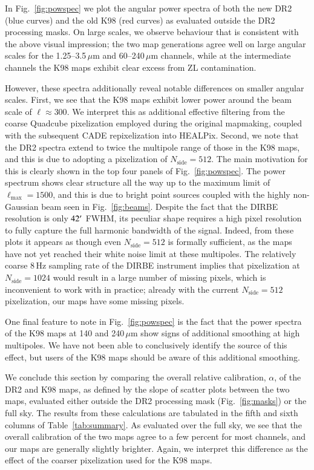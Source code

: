 \documentclass{aa}
\begin{document}
In Fig.~\ref{fig:powspec} we plot the angular power spectra of both
the new DR2 (blue curves) and the old K98 (red curves) as evaluated
outside the DR2 processing masks. On large scales, we observe
behaviour that is consistent with the above visual impression; the two
map generations agree well on large angular scales for the
1.25--3.5$\,\mu$m and 60--240$\,\mu$m channels, while at the
intermediate channels the K98 maps exhibit clear excess from ZL
contamination.

However, these spectra additionally reveal notable differences on
smaller angular scales. First, we see that the K98 maps exhibit lower
power around the beam scale of $\ell\approx300$. We interpret this as
additional effective filtering from the coarse Quadcube
pixelization employed during the original mapmaking, coupled with the
subsequent CADE repixelization into HEALPix. Second, we note that the
DR2 spectra extend to twice the multipole range of those in the K98 maps, and
this is due to adopting a pixelization of $N_{\mathrm{side}}=512$. The
main motivation for this is clearly shown in the top four panels of
Fig.~\ref{fig:powspec}. The power spectrum shows clear structure all
the way up to the maximum limit of $\ell_{\mathrm{max}}=1500$, and
this is due to bright point sources coupled with the highly
non-Gaussian beam seen in Fig.~\ref{fig:beams}. Despite the fact that
the DIRBE resolution is only $42\arcm$ FWHM, its peculiar shape
requires a high pixel resolution to fully capture the full harmonic
bandwidth of the signal. Indeed, from these plots it appears as though
even $N_{\mathrm{side}}=512$ is formally sufficient, as the maps have
not yet reached their white noise limit at these
multipoles. The relatively coarse 8\,Hz sampling rate
of the DIRBE instrument implies that pixelization at
$N_{\mathrm{side}}=1024$ would result in a large number of missing
pixels, which is inconvenient to work with in practice; already with
the current $N_{\mathrm{side}}=512$ pixelization, our maps have some
missing pixels.

One final feature to note in Fig.~\ref{fig:powspec} is the fact that
the power spectra of the K98 maps at 140 and 240$\,\mu$m show signs of
additional smoothing at high multipoles. We have not been able to
conclusively identify the source of this effect, but users of the K98
maps should be aware of this additional smoothing.

We conclude this section by comparing the overall relative
calibration, $\alpha$, of the DR2 and K98 maps, as defined by the
slope of scatter plots between the two maps, evaluated either
outside the DR2 processing mask (Fig.~\ref{fig:masks}) or the full sky. The results from
these calculations are tabulated in the fifth and sixth columns of
Table~\ref{tab:summary}. As evaluated over the full sky, we see that
the overall calibration of the two maps agree to a few percent for
most channels, and our maps are generally slightly brighter. Again, we
interpret this difference as the effect of the coarser pixelization
used for the K98 maps. 
\end{document}
